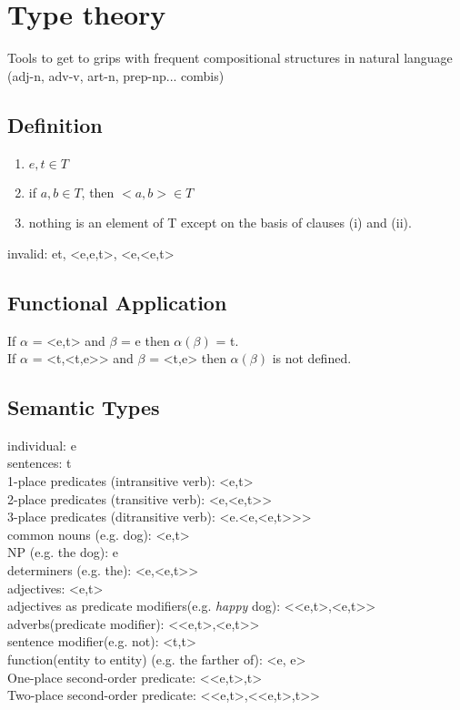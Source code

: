 \section{Type theory}
Tools to get to grips with frequent compositional structures in natural language (adj-n, adv-v, art-n, prep-np... combis)

\subsection*{Definition}
\begin{enumerate}
\item $e, t \in T$
\item if $a, b \in T$, then $<a, b> \in T$
\item nothing is an element of T except on the basis of clauses (i) and (ii).
\end{enumerate}
invalid: et, <e,e,t>, <e,<e,t>\\

\subsection*{Functional Application}
If $\alpha$ = <e,t> and $\beta$ = e then $\alpha (\beta)$ = t. \\
If $\alpha$ = <t,<t,e>> and $\beta$ = <t,e> then $\alpha (\beta)$ is not defined.

\subsection*{Semantic Types}
individual: e \\
sentences: t \\
1-place predicates (intransitive verb): <e,t> \\
2-place predicates (transitive verb): <e,<e,t>> \\
3-place predicates (ditransitive verb): <e.<e,<e,t>>> \\
common nouns (e.g. dog): <e,t> \\
NP (e.g. the dog): e \\
determiners (e.g. the): <e,<e,t>> \\
adjectives: <e,t> \\
adjectives as predicate modifiers(e.g. \emph{happy} dog): <<e,t>,<e,t>> \\
adverbs(predicate modifier): <<e,t>,<e,t>> \\
sentence modifier(e.g. not): <t,t> \\
function(entity to entity) (e.g. the farther of): <e, e> \\
One-place second-order predicate: <<e,t>,t> \\
Two-place second-order predicate: <<e,t>,<<e,t>,t>> 

